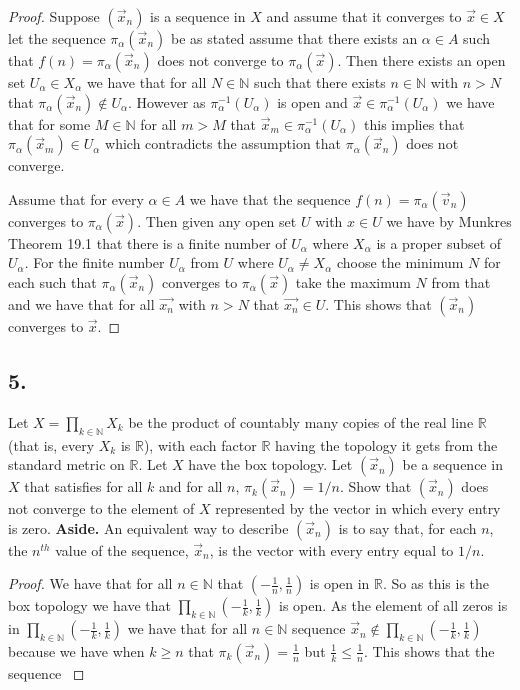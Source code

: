 \documentclass{amsart}
\theoremstyle{plain}
\theoremstyle{definition}
\theoremstyle{remark}
\begin{document}
\begin{proof}
    Suppose $(\vec{x}_n)$ is a sequence in $X$ and assume that it converges to $\vec{x}\in X$ let the sequence $\pi_\alpha(\vec{x}_n)$ be as stated assume that there exists an $\alpha \in A$ such that $f(n)=\pi_\alpha(\vec x_n)$ does not converge to $\pi_\alpha(\vec x)$. Then there exists an open set $U_\alpha\in X_\alpha$ we have that for all $N\in \mathbb{N}$ such that there exists $n\in \mathbb{N}$ with $n>N$ that $\pi_\alpha(\vec x_n)\not \in U_\alpha$. However as $\pi_\alpha^{-1}(U_\alpha)$ is open and $\vec{x} \in \pi_\alpha^{-1}(U_\alpha)$ we have that for some $M\in \mathbb{N}$ for all $m>M$  that $\vec x_m\in \pi_\alpha^{-1}(U_\alpha)$ this implies that $\pi_\alpha(\vec x_m) \in U_\alpha$ which contradicts the assumption that $\pi_\alpha(\vec x_n)$ does not converge. 
    
    Assume that for every $\alpha\in A$ we have that the sequence $f(n)=\pi_\alpha(\vec v_n)$ converges to $\pi_{\alpha}(\vec x)$. Then given any open set $U$ with $x\in U$ we have by Munkres Theorem 19.1 that there is a finite number of $U_\alpha$ where $X_\alpha$ is a proper subset of $U_\alpha$. For the finite number $U_\alpha$ from $U$ where $U_\alpha\not = X_\alpha$ choose the minimum $N$ for each such that $\pi_\alpha(\vec{x}_n)$ converges to $\pi_\alpha(\vec{x})$ take the maximum $N$ from that and we have that for all $\vec{x_n}$ with $n>N$ that $\vec{x_n}\in U$. This shows that $(\vec x_n)$ converges to $\vec x$.
\end{proof}


\vspace{.15in}

\noindent
\subsection*{5.} Let $X =\prod _{k\in \mathbb N} X_k$ be the product of countably many copies of the real line $\mathbb R$  (that is, every $X_k$ is $\mathbb R$), with each factor $\mathbb R$ having the topology it gets from the standard metric on $\mathbb R$. Let $X$ have the box topology. Let $(\vec{x}_n)$ be a sequence in $X$ that satisfies for all $k$ and for all $n$, $\pi_k  (\vec{x}_n) = 1/n$. Show that $(\vec{x}_n)$ does not converge to the element of $X$ represented by the vector in which every entry is zero. {\bfseries Aside.} An equivalent way to describe $(\vec{x}_n)$ is to say that, for each $n$, the $n^{th}$ value of the sequence, $\vec{x}_n$, is the vector with every entry equal to $1/n$.

 \begin{proof}
    We have that for all $n\in \mathbb{N}$ that $(-\frac{1}{n},\frac{1}{n})$ is open in $\mathbb{R}$. So as this is the box topology we have that $\prod_{k\in\mathbb{N}}(-\frac{1}{k},\frac{1}{k})$ is open. As the element of all zeros is in $\prod_{k\in\mathbb{N}}(-\frac{1}{k},\frac{1}{k})$ we have that for all $n \in \mathbb{N}$ sequence $\vec{x}_n\not \in  \prod_{k\in\mathbb{N}}(-\frac{1}{k},\frac{1}{k})$ because we have when $k\geq n$ that $\pi_k(\vec{x}_n)=\frac{1}{n}$ but $\frac{1}{k}\leq \frac{1}{n}$. This shows that the sequence $$


 \end{proof}

 
\end{document}
